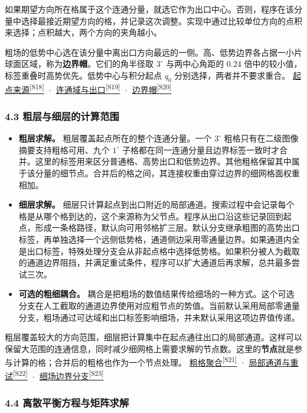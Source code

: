 \documentclass[11pt,a4paper]{article}
\numberwithin{equation}{topic}
\newcommand{\sourceref}[2]{\hyperlink{source-#1}{#2\textsuperscript{[#1]}}}
\begin{document}
如果期望方向所在格属于这个连通分量，就选它作为出口中心。否则，程序在该分量中选择最接近期望方向的格，并记录这次调整。实现中通过比较单位方向的点积来选择；点积越大，两个方向的夹角越小。

粗场的低势中心选在该分量中离出口方向最远的一侧。高、低势边界各占据一小片球面区域，称为\textbf{边界帽}。它们的角半径取 \(3^\circ\) 与两中心角距的 \(0.24\) 倍中的较小值，标签重叠时高势优先。低势中心与积分起点 \(q_0\) 分别选择，两者并不要求重合。 \sourceref{S18}{起点来源} · \sourceref{S19}{连通域与出口} · \sourceref{S20}{边界帽}

\subsubsection*{4.3 粗层与细层的计算范围}

\begin{itemize}
\item \textbf{粗层求解。} 粗层覆盖起点所在的整个连通分量。一个 \(3^\circ\) 粗格只有在二级图像摘要支持粗格可用、九个 \(1^\circ\) 子格都在同一连通分量且边界标签一致时才合并。这里的标签用来区分普通格、高势出口和低势边界。其他粗格保留其中属于该分量的细节点。合并后的格之间，其连接权重由穿过边界的细网格面权重相加。
\item \textbf{细层求解。} 细层只计算起点到出口附近的局部通道。搜索过程中会记录每个格是从哪个格到达的，这个来源称为父节点。程序从出口沿这些记录回到起点，形成一条格路径，默认向可用邻格扩三层。默认分支继承粗图的高势出口标签，再单独选择一个远侧低势格，通道侧边采用零通量边界。如果通道内全是出口标签，特殊处理分支会从非起点格中选择低势格。如果积分被人为截取的通道边界阻挡，并满足重试条件，程序可以扩大通道后再求解，总共最多尝试三次。
\item \textbf{可选的粗细耦合。} 耦合是把粗场的数值结果传给细场的一种方式。这个可选分支在人工截取的通道边界使用对应粗节点的势值。当前默认采用局部零通量分支，粗场通过可达域和出口标签影响细场，并未默认采用这项边界值传递。
\end{itemize}

粗层覆盖较大的方向范围，细层把计算集中在起点通往出口的局部通道。这样可以保留大范围的连通信息，同时减少细网格上需要求解的节点数。这里的\textbf{节点}就是参与计算的格；合并后的粗格也作为一个节点处理。 \sourceref{S21}{粗格聚合} · \sourceref{S22}{局部通道与重试} · \sourceref{S23}{细场边界分支}

\subsubsection*{4.4 离散平衡方程与矩阵求解}
\end{document}
